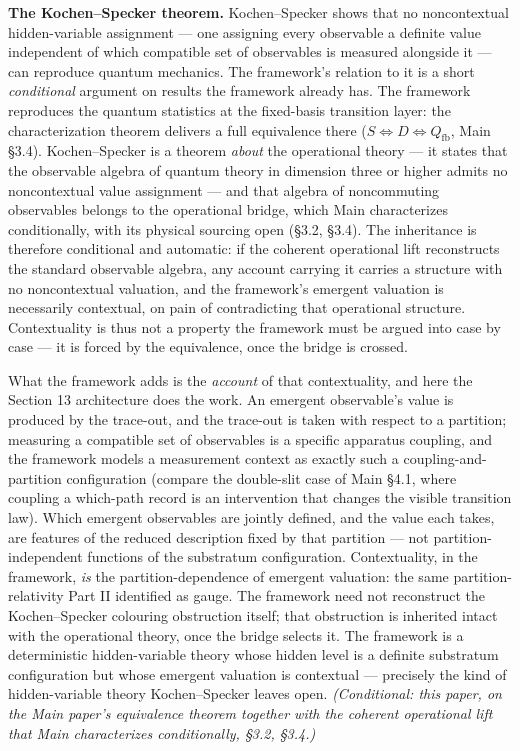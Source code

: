 \documentclass[
]{article}
\begin{document}
\textbf{The Kochen--Specker theorem.} Kochen--Specker shows that no
noncontextual hidden-variable assignment --- one assigning every
observable a definite value independent of which compatible set of
observables is measured alongside it --- can reproduce quantum
mechanics. The framework's relation to it is a short \emph{conditional}
argument on results the framework already has. The framework reproduces
the quantum statistics at the fixed-basis transition layer: the
characterization theorem delivers a full equivalence there
(\(S \iff D \iff Q_{\mathrm{fb}}\), Main §3.4). Kochen--Specker is a
theorem \emph{about} the operational theory --- it states that the
observable algebra of quantum theory in dimension three or higher admits
no noncontextual value assignment --- and that algebra of noncommuting
observables belongs to the operational bridge, which Main characterizes
conditionally, with its physical sourcing open (§3.2, §3.4). The
inheritance is therefore conditional and automatic: if the coherent
operational lift reconstructs the standard observable algebra, any
account carrying it carries a structure with no noncontextual valuation,
and the framework's emergent valuation is necessarily contextual, on
pain of contradicting that operational structure. Contextuality is thus
not a property the framework must be argued into case by case --- it is
forced by the equivalence, once the bridge is crossed.

What the framework adds is the \emph{account} of that contextuality, and
here the Section 13 architecture does the work. An emergent observable's
value is produced by the trace-out, and the trace-out is taken with
respect to a partition; measuring a compatible set of observables is a
specific apparatus coupling, and the framework models a measurement
context as exactly such a coupling-and-partition configuration (compare
the double-slit case of Main §4.1, where coupling a which-path record is
an intervention that changes the visible transition law). Which emergent
observables are jointly defined, and the value each takes, are features
of the reduced description fixed by that partition --- not
partition-independent functions of the substratum configuration.
Contextuality, in the framework, \emph{is} the partition-dependence of
emergent valuation: the same partition-relativity Part II identified as
gauge. The framework need not reconstruct the Kochen--Specker colouring
obstruction itself; that obstruction is inherited intact with the
operational theory, once the bridge selects it. The framework is a
deterministic hidden-variable theory whose hidden level is a definite
substratum configuration but whose emergent valuation is contextual ---
precisely the kind of hidden-variable theory Kochen--Specker leaves
open. \emph{(Conditional: this paper, on the Main paper's equivalence
theorem together with the coherent operational lift that Main
characterizes conditionally, §3.2, §3.4.)}
\end{document}
